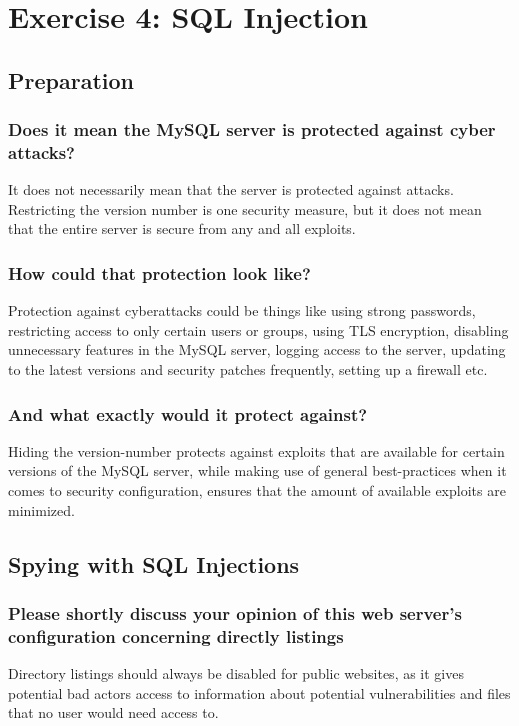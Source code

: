 \section{Exercise 4: SQL Injection}
\subsection{Preparation}
\subsubsection{Does it mean the MySQL server is protected against cyber attacks?}
It does not necessarily mean that the server is protected against attacks. Restricting the version number is one security measure, but it does not mean that the entire server is secure from any and all exploits.

\subsubsection{How could that protection look like?}
Protection against cyberattacks could be things like using strong passwords, restricting access to only certain users or groups, using TLS encryption, disabling unnecessary features in the MySQL server, logging access to the server, updating to the latest versions and security patches frequently, setting up a firewall etc.

\subsubsection{And what exactly would it protect against?}
Hiding the version-number protects against exploits that are available for certain versions of the MySQL server, while making use of general best-practices when it comes to security configuration, ensures that the amount of available exploits are minimized.

\subsection{Spying with SQL Injections}
\subsubsection{Please shortly discuss your opinion of this web server's configuration concerning directly listings}
Directory listings should always be disabled for public websites, as it gives potential bad actors access to information about potential vulnerabilities and files that no user would need access to.

